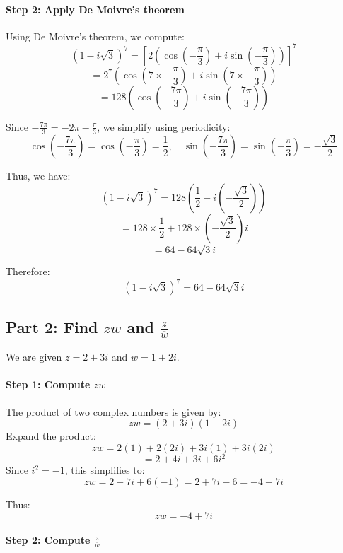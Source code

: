 \documentclass[11pt]{article}
\begin{document}
\paragraph{Step 2: Apply De Moivre's theorem}

Using De Moivre's theorem, we compute:
\[
(1 - i\sqrt{3})^7 = \left[ 2 \left( \cos\left( -\frac{\pi}{3} \right) + i \sin\left( -\frac{\pi}{3} \right) \right) \right]^7
\]
\[
= 2^7 \left( \cos\left( 7 \times -\frac{\pi}{3} \right) + i \sin\left( 7 \times -\frac{\pi}{3} \right) \right)
\]
\[
= 128 \left( \cos\left( -\frac{7\pi}{3} \right) + i \sin\left( -\frac{7\pi}{3} \right) \right)
\]

Since \( -\frac{7\pi}{3} = -2\pi - \frac{\pi}{3} \), we simplify using periodicity:
\[
\cos\left( -\frac{7\pi}{3} \right) = \cos\left( -\frac{\pi}{3} \right) = \frac{1}{2}, \quad \sin\left( -\frac{7\pi}{3} \right) = \sin\left( -\frac{\pi}{3} \right) = -\frac{\sqrt{3}}{2}
\]

Thus, we have:
\[
(1 - i\sqrt{3})^7 = 128 \left( \frac{1}{2} + i \left( -\frac{\sqrt{3}}{2} \right) \right)
\]
\[
= 128 \times \frac{1}{2} + 128 \times \left( -\frac{\sqrt{3}}{2} \right) i
\]
\[
= 64 - 64\sqrt{3} i
\]

Therefore:
\[
(1 - i\sqrt{3})^7 = 64 - 64\sqrt{3} i
\]

\newpage

\subsection{Part 2: Find \( zw \) and \( \frac{z}{\overline{w}} \)}

We are given \( z = 2 + 3i \) and \( w = 1 + 2i \).

\paragraph{Step 1: Compute \( zw \)}

The product of two complex numbers is given by:
\[
zw = (2 + 3i)(1 + 2i)
\]
Expand the product:
\[
zw = 2(1) + 2(2i) + 3i(1) + 3i(2i)
\]
\[
= 2 + 4i + 3i + 6i^2
\]
Since \( i^2 = -1 \), this simplifies to:
\[
zw = 2 + 7i + 6(-1) = 2 + 7i - 6 = -4 + 7i
\]

Thus:
\[
zw = -4 + 7i
\]

\paragraph{Step 2: Compute \( \frac{z}{\overline{w}} \)}
\end{document}
